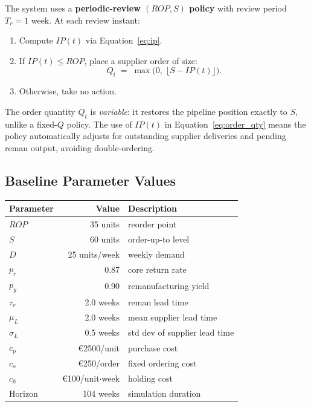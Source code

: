 \documentclass[11pt]{article}
\begin{document}
The system uses a \textbf{periodic-review $(ROP,S)$ policy} with review period
$T_r = 1$ week.  At each review instant:
\begin{enumerate}
  \item Compute $IP(t)$ via Equation~\eqref{eq:ip}.
  \item If $IP(t) \le ROP$, place a supplier order of size:
        \begin{equation}
          Q_t \;=\; \max\!\bigl(0,\;\lfloor S - IP(t) \rfloor\bigr).
          \label{eq:order_qty}
        \end{equation}
  \item Otherwise, take no action.
\end{enumerate}
The order quantity $Q_t$ is \emph{variable}: it restores the pipeline position
exactly to $S$, unlike a fixed-$Q$ policy.  The use of $IP(t)$ in
Equation~\eqref{eq:order_qty} means the policy automatically adjusts for
outstanding supplier deliveries and pending reman output, avoiding double-ordering.

\subsection{Baseline Parameter Values}

\begin{center}
\begin{tabular}{lrl}
\toprule
Parameter & Value & Description \\
\midrule
$ROP$            & 35 units & reorder point \\
$S$              & 60 units & order-up-to level \\
$D$              & 25 units/week & weekly demand \\
$p_r$            & 0.87 & core return rate \\
$p_y$            & 0.90 & remanufacturing yield \\
$\tau_r$         & 2.0 weeks & reman lead time \\
$\mu_L$          & 2.0 weeks & mean supplier lead time \\
$\sigma_L$       & 0.5 weeks & std dev of supplier lead time \\
$c_p$            & \euro 2500/unit & purchase cost \\
$c_o$            & \euro250/order & fixed ordering cost \\
$c_h$            & \euro100/unit$\cdot$week & holding cost \\
Horizon          & 104 weeks & simulation duration \\
\bottomrule
\end{tabular}
\end{center}
\end{document}
